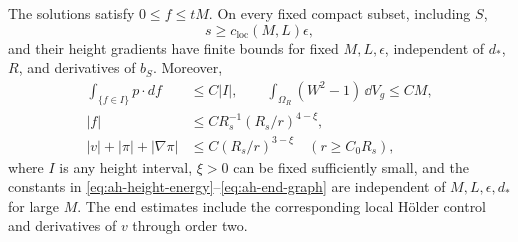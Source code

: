 \begin{lemma}\label{lem:ah-graph-estimates}
The solutions satisfy \(0\le f\le tM\).  On every fixed compact
subset, including \(S\),
\begin{equation}\label{eq:ah-s-floor}
 s\ge c_{\mathrm{loc}}(M,L)\epsilon ,
\end{equation}
and their height gradients have finite bounds for fixed
\(M,L,\epsilon\), independent of \(d_*\), \(R\), and derivatives
of \(b_S\).  Moreover,
\begin{align}
 \int_{\{f\in I\}}p\cdot df&\le C|I|,\qquad
 \int_{\Omega_R}(W^2-1)\,\dd V_g\le CM,\label{eq:ah-height-energy}\\
 |f|&\le C R_s^{-1}(R_s/r)^{4-\xi},\nonumber\\
 |v|+|\pi|+|\nabla\pi|&\le C(R_s/r)^{3-\xi}
       \quad(r\ge C_0R_s),\label{eq:ah-end-graph}
\end{align}
where \(I\) is any height interval, \(\xi>0\) can be fixed
sufficiently small, and the constants in
\eqref{eq:ah-height-energy}--\eqref{eq:ah-end-graph} are
independent of \(M,L,\epsilon,d_*\) for large \(M\).
The end estimates include the corresponding local Hölder
control and derivatives of \(v\) through order two.
\end{lemma}

